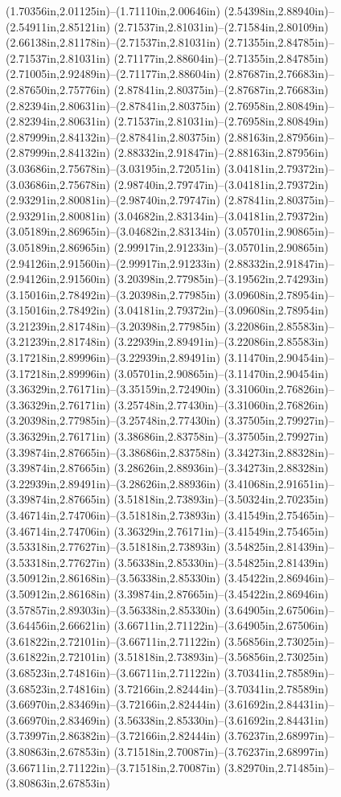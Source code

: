 (1.70356in,2.01125in)--(1.71110in,2.00646in) (2.54398in,2.88940in)--(2.54911in,2.85121in) (2.71537in,2.81031in)--(2.71584in,2.80109in) (2.66138in,2.81178in)--(2.71537in,2.81031in) (2.71355in,2.84785in)--(2.71537in,2.81031in) (2.71177in,2.88604in)--(2.71355in,2.84785in) (2.71005in,2.92489in)--(2.71177in,2.88604in) (2.87687in,2.76683in)--(2.87650in,2.75776in) (2.87841in,2.80375in)--(2.87687in,2.76683in) (2.82394in,2.80631in)--(2.87841in,2.80375in) (2.76958in,2.80849in)--(2.82394in,2.80631in) (2.71537in,2.81031in)--(2.76958in,2.80849in) (2.87999in,2.84132in)--(2.87841in,2.80375in) (2.88163in,2.87956in)--(2.87999in,2.84132in) (2.88332in,2.91847in)--(2.88163in,2.87956in) (3.03686in,2.75678in)--(3.03195in,2.72051in) (3.04181in,2.79372in)--(3.03686in,2.75678in) (2.98740in,2.79747in)--(3.04181in,2.79372in) (2.93291in,2.80081in)--(2.98740in,2.79747in) (2.87841in,2.80375in)--(2.93291in,2.80081in) (3.04682in,2.83134in)--(3.04181in,2.79372in) (3.05189in,2.86965in)--(3.04682in,2.83134in) (3.05701in,2.90865in)--(3.05189in,2.86965in) (2.99917in,2.91233in)--(3.05701in,2.90865in) (2.94126in,2.91560in)--(2.99917in,2.91233in) (2.88332in,2.91847in)--(2.94126in,2.91560in) (3.20398in,2.77985in)--(3.19562in,2.74293in) (3.15016in,2.78492in)--(3.20398in,2.77985in) (3.09608in,2.78954in)--(3.15016in,2.78492in) (3.04181in,2.79372in)--(3.09608in,2.78954in) (3.21239in,2.81748in)--(3.20398in,2.77985in) (3.22086in,2.85583in)--(3.21239in,2.81748in) (3.22939in,2.89491in)--(3.22086in,2.85583in) (3.17218in,2.89996in)--(3.22939in,2.89491in) (3.11470in,2.90454in)--(3.17218in,2.89996in) (3.05701in,2.90865in)--(3.11470in,2.90454in) (3.36329in,2.76171in)--(3.35159in,2.72490in) (3.31060in,2.76826in)--(3.36329in,2.76171in) (3.25748in,2.77430in)--(3.31060in,2.76826in) (3.20398in,2.77985in)--(3.25748in,2.77430in) (3.37505in,2.79927in)--(3.36329in,2.76171in) (3.38686in,2.83758in)--(3.37505in,2.79927in) (3.39874in,2.87665in)--(3.38686in,2.83758in) (3.34273in,2.88328in)--(3.39874in,2.87665in) (3.28626in,2.88936in)--(3.34273in,2.88328in) (3.22939in,2.89491in)--(3.28626in,2.88936in) (3.41068in,2.91651in)--(3.39874in,2.87665in) (3.51818in,2.73893in)--(3.50324in,2.70235in) (3.46714in,2.74706in)--(3.51818in,2.73893in) (3.41549in,2.75465in)--(3.46714in,2.74706in) (3.36329in,2.76171in)--(3.41549in,2.75465in) (3.53318in,2.77627in)--(3.51818in,2.73893in) (3.54825in,2.81439in)--(3.53318in,2.77627in) (3.56338in,2.85330in)--(3.54825in,2.81439in) (3.50912in,2.86168in)--(3.56338in,2.85330in) (3.45422in,2.86946in)--(3.50912in,2.86168in) (3.39874in,2.87665in)--(3.45422in,2.86946in) (3.57857in,2.89303in)--(3.56338in,2.85330in) (3.64905in,2.67506in)--(3.64456in,2.66621in) (3.66711in,2.71122in)--(3.64905in,2.67506in) (3.61822in,2.72101in)--(3.66711in,2.71122in) (3.56856in,2.73025in)--(3.61822in,2.72101in) (3.51818in,2.73893in)--(3.56856in,2.73025in) (3.68523in,2.74816in)--(3.66711in,2.71122in) (3.70341in,2.78589in)--(3.68523in,2.74816in) (3.72166in,2.82444in)--(3.70341in,2.78589in) (3.66970in,2.83469in)--(3.72166in,2.82444in) (3.61692in,2.84431in)--(3.66970in,2.83469in) (3.56338in,2.85330in)--(3.61692in,2.84431in) (3.73997in,2.86382in)--(3.72166in,2.82444in) (3.76237in,2.68997in)--(3.80863in,2.67853in) (3.71518in,2.70087in)--(3.76237in,2.68997in) (3.66711in,2.71122in)--(3.71518in,2.70087in) (3.82970in,2.71485in)--(3.80863in,2.67853in) 